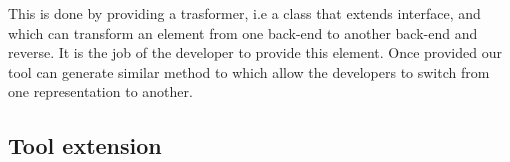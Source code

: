         This is done by providing a trasformer, i.e a class that extends  interface, and which can transform an element from one back-end to another back-end and reverse. It is the job
of the developer to provide this element. Once provided our tool can generate similar method to  which allow the developers to switch from one representation to another.

\subsection{Tool extension}
        

